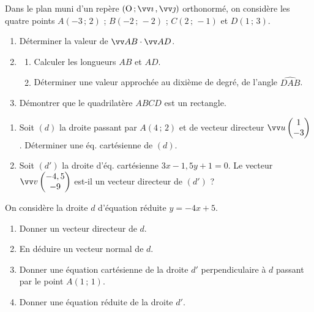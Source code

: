 \documentclass[a4paper,11pt]{article}
\begin{document}
\begin{cexercice}
Dans le plan muni d’un repère $\Rij$ orthonormé, on considère les quatre points $A(-3\,;\,2)$ ; $B(-2\,;\,-2)$ ; $C(2\,;\,-1)$ et $D(1\,;\,3)$.
%
\begin{enumerate}[]
	\item Déterminer la valeur de $\vect{AB}\cdot\vect{AD}$.
	\item 
	\begin{enumerate}
		\item Calculer les longueurs $AB$ et $AD$.
		\item Déterminer une valeur approchée au dixième de degré, de l'angle $\widehat{DAB}$.
	\end{enumerate}
	\item Démontrer que le quadrilatère $ABCD$ est un rectangle.
\end{enumerate}
\end{cexercice}

\begin{cexercice}
\vspace{-0.8\baselineskip}
\begin{enumerate}[leftmargin=*]
	\item Soit $(d)$ la droite passant par $A(4\,;\,2)$ et de vecteur directeur $\vect{u}\coordeux{1}{-3}$. Déterminer une éq. cartésienne de $(d)$.
	\item Soit $(d')$ la droite d’éq. cartésienne $3x - 1,5y + 1 = 0$. Le vecteur $\vect{v} \coordeux{-4,5}{-9}$ est-il un vecteur directeur de $(d')$ ?
\end{enumerate}
\end{cexercice}

\begin{cexercice}
On considère la droite $d$ d’équation réduite $y = -4x + 5$.
%
\begin{enumerate}
	\item Donner un vecteur directeur de $d$.
	\item En déduire un vecteur normal de $d$.
	\item Donner une équation cartésienne de la droite $d'$ perpendiculaire à $d$ passant par le point $A(1\,;\,1)$.
	\item Donner une équation réduite de la droite $d'$.
\end{enumerate}
\end{cexercice}
\end{document}

